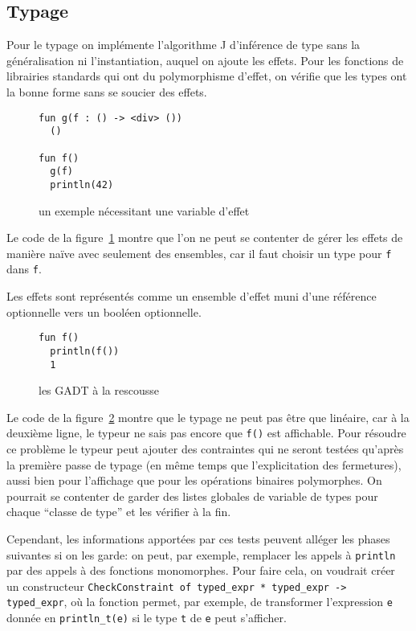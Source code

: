 \documentclass[11pt]{article}
\begin{document}
\subsection{Typage}
Pour le typage on implémente l'algorithme J d'inférence de type sans la
généralisation ni l'instantiation, auquel on ajoute les effets. Pour les
fonctions de librairies standards qui ont du polymorphisme d'effet, on vérifie
que les types ont la bonne forme sans se soucier des effets.

\begin{figure}[h]\label{code2}
\begin{verbatim}
fun g(f : () -> <div> ())
  ()

fun f()
  g(f)
  println(42)
\end{verbatim}
\caption{un exemple nécessitant une variable d'effet}
\end{figure}

Le code de la figure~\ref{code2} montre que l'on ne peut se contenter de gérer
les effets de manière naïve avec seulement des ensembles, car il faut choisir un
type pour \texttt{f} dans \texttt{f}.

Les effets sont représentés comme un ensemble d'effet muni d'une référence
optionnelle vers un booléen optionnelle.

\begin{figure}[h]
\label{code1}
\begin{verbatim}
fun f()
  println(f())
  1
\end{verbatim}
\caption{les GADT à la rescousse}
\end{figure}

Le code de la figure~\ref{code1} montre que le typage ne peut pas être que
linéaire, car à la deuxième ligne, le typeur ne sais pas encore que \texttt{f()}
est affichable. Pour résoudre ce problème le typeur peut ajouter des contraintes
qui ne seront testées qu'après la première passe de typage (en même temps que
l'explicitation des fermetures), aussi bien pour l'affichage que pour les
opérations binaires polymorphes. On pourrait se contenter de garder des listes
globales de variable de types pour chaque ``classe de type'' et les vérifier à
la fin.

Cependant, les informations apportées par ces tests peuvent alléger les phases
suivantes si on les garde: on peut, par exemple, remplacer les appels à
\texttt{println} par des appels à des fonctions monomorphes. Pour faire cela, on
voudrait créer un constructeur \texttt{CheckConstraint of typed\_expr *
  typed\_expr -> typed\_expr}, où la fonction permet, par exemple, de
transformer l'expression \texttt{e} donnée en \texttt{println\_t(e)} si le type
\texttt{t} de \texttt{e} peut s'afficher.
\end{document}
